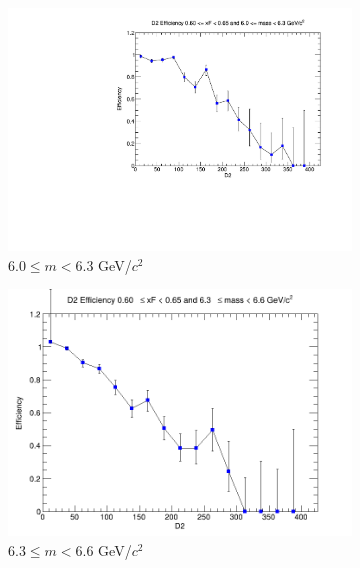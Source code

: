 \documentclass[11pt]{article}
\begin{document}
\begin{figure}[p]
\begin{subfigure}[b]{0.32\textwidth}
        \includegraphics[width=\textwidth]{./kTrackerEfficiencyPlots/D2_Efficiency_xF12_mass6.pdf}
        \caption{$6.0 \leq m < 6.3$ GeV/$c^2$}
    \end{subfigure}\hfill
    \begin{subfigure}[b]{0.32\textwidth}
        \centering
        \includegraphics[width=\textwidth]{./kTrackerEfficiencyPlots/D2_Efficiency_xF12_mass7.png}
        \caption{$6.3 \leq m < 6.6$ GeV/$c^2$}
    \end{subfigure}\hfill
    \begin{subfigure}[b]{0.32\textwidth}
        \centering

\end{subfigure}
\end{figure}
\end{document}
